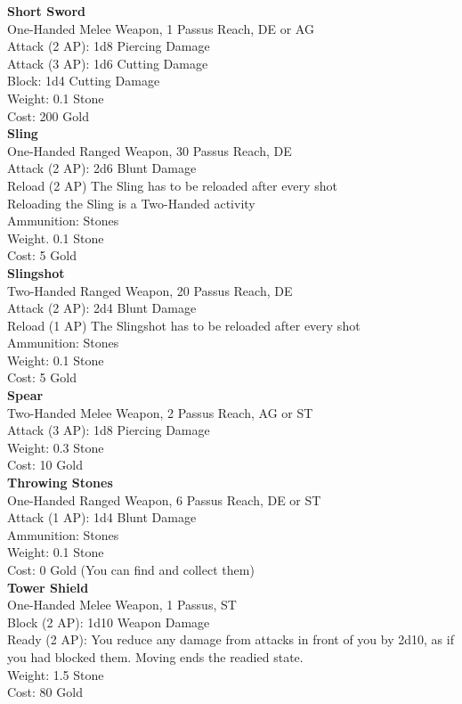\textbf{Short Sword}\\
One-Handed Melee Weapon, 1 Passus Reach, DE or AG\\
Attack (2 AP): 1d8 Piercing Damage\\
Attack (3 AP): 1d6 Cutting Damage\\
Block: 1d4 Cutting Damage\\
Weight: 0.1 Stone\\
Cost: 200 Gold\\


\textbf{Sling}\\
One-Handed Ranged Weapon, 30 Passus Reach, DE\\
Attack (2 AP): 2d6 Blunt Damage\\
Reload (2 AP) The Sling has to be reloaded after every shot\\
Reloading the Sling is a Two-Handed activity\\
Ammunition: Stones\\
Weight. 0.1 Stone\\
Cost: 5 Gold\\


\textbf{Slingshot}\\
Two-Handed Ranged Weapon, 20 Passus Reach, DE\\
Attack (2 AP): 2d4 Blunt Damage\\
Reload (1 AP) The Slingshot has to be reloaded after every shot\\
Ammunition: Stones\\
Weight: 0.1 Stone\\
Cost: 5 Gold\\


\textbf{Spear}\\
Two-Handed Melee Weapon, 2 Passus Reach, AG or ST\\
Attack (3 AP): 1d8 Piercing Damage\\
Weight: 0.3 Stone\\
Cost: 10 Gold\\


\textbf{Throwing Stones}\\
One-Handed Ranged Weapon, 6 Passus Reach, DE or ST\\
Attack (1 AP): 1d4 Blunt Damage\\
Ammunition: Stones\\
Weight: 0.1 Stone\\
Cost: 0 Gold (You can find and collect them)\\


\textbf{Tower Shield}\\
One-Handed Melee Weapon, 1 Passus, ST\\
Block (2 AP): 1d10 Weapon Damage\\
Ready (2 AP): You reduce any damage from attacks in front of you by 2d10, as if you had blocked them. Moving ends the readied state.\\
Weight: 1.5 Stone\\
Cost: 80 Gold\\


